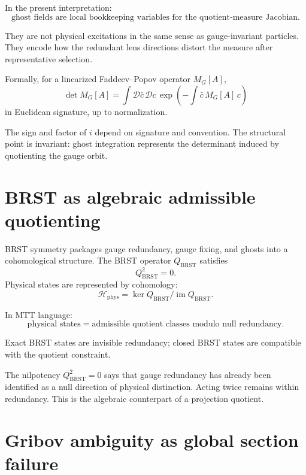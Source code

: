 \documentclass[11pt]{article}
\begin{document}
In the present interpretation:
\[
\boxed{\text{ghost fields are local bookkeeping variables for the quotient-measure Jacobian.}}
\]

They are not physical excitations in the same sense as gauge-invariant particles. They encode how the redundant lens directions distort the measure after representative selection.

\begin{proposition}
Formally, for a linearized Faddeev--Popov operator \(M_G[A]\),
\[
\det M_G[A]
=
\int \mathcal D\bar c\,\mathcal Dc\,
\exp\left(-\int \bar c\,M_G[A]\,c\right)
\]
in Euclidean signature, up to normalization.
\end{proposition}

\begin{remark}
The sign and factor of \(i\) depend on signature and convention. The structural point is invariant: ghost integration represents the determinant induced by quotienting the gauge orbit.
\end{remark}

\section{BRST as algebraic admissible quotienting}

BRST symmetry packages gauge redundancy, gauge fixing, and ghosts into a cohomological structure. The BRST operator \(Q_{\mathrm{BRST}}\) satisfies
\[
Q_{\mathrm{BRST}}^2=0.
\]
Physical states are represented by cohomology:
\[
\mathcal H_{\mathrm{phys}}
=
\ker Q_{\mathrm{BRST}}/\operatorname{im}Q_{\mathrm{BRST}}.
\]

In MTT language:
\[
\boxed{
\text{physical states}=
\text{admissible quotient classes modulo null redundancy}.
}
\]

Exact BRST states are invisible redundancy; closed BRST states are compatible with the quotient constraint.

\begin{remark}
The nilpotency \(Q_{\mathrm{BRST}}^2=0\) says that gauge redundancy has already been identified as a null direction of physical distinction. Acting twice remains within redundancy. This is the algebraic counterpart of a projection quotient.
\end{remark}

\section{Gribov ambiguity as global section failure}
\end{document}
